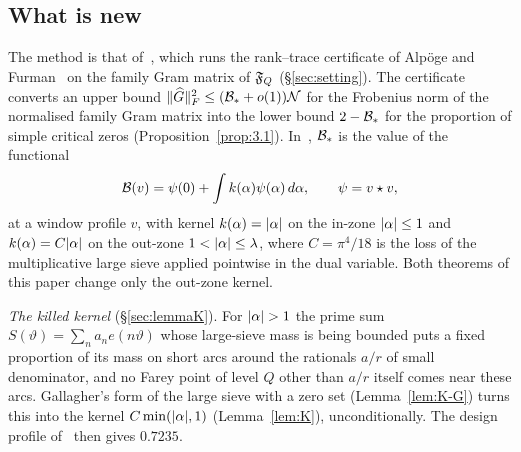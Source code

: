 \subsection{What is new}\label{ssec:new}
The method is that of~\cite{DSouza}, which runs the rank--trace certificate of Alp\"oge and Furman~\cite{AF} on the family Gram matrix of $\mathfrak F_Q$
(\S\ref{sec:setting}). The certificate converts an upper bound $\lVert \widehat G\rVert_F^2\le(\mathcal B_*+o(1))\mathcal N$ for the Frobenius norm of the
normalised family Gram matrix into the lower bound $2-\mathcal B_*$ for the proportion of simple critical zeros (Proposition~\ref{prop:3.1}).
In~\cite{DSouza}, $\mathcal B_*$ is the value of the functional
\[
\mathcal B(v)=\psi(0)+\int k(\alpha)\psi(\alpha)\,d\alpha,\qquad \psi=v\star v,
\]
at a window profile $v$, with kernel $k(\alpha)=\lvert \alpha\rvert$ on the in-zone $\lvert \alpha\rvert\le1$ and $k(\alpha)=C\lvert \alpha\rvert$ on the out-zone
$1<\lvert \alpha\rvert\le\lambda$, where $C=\pi^4/18$ is the loss of the multiplicative large sieve applied pointwise in the dual variable. Both theorems
of this paper change only the out-zone kernel.

\emph{The killed kernel} (\S\ref{sec:lemmaK}). For $\lvert \alpha\rvert>1$ the prime sum $S(\vartheta)=\sum_na_n e(n\vartheta)$ whose large-sieve mass is
being bounded puts a fixed proportion of its mass on short arcs around the rationals $a/r$ of small denominator, and no Farey point of level $Q$
other than $a/r$ itself comes near these arcs. Gallagher's form of the large sieve with a zero set (Lemma~\ref{lem:K-G}) turns this into the
kernel $C\min(\lvert \alpha\rvert,1)$ (Lemma~\ref{lem:K}), unconditionally. The design profile of~\cite{DSouza} then gives $0.7235$.

